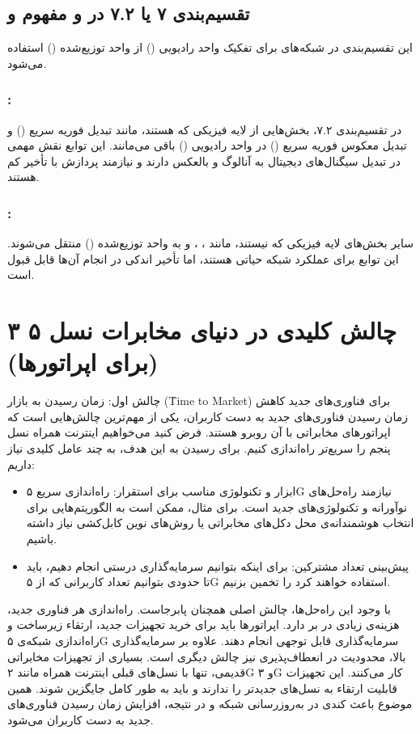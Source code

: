 \documentclass[landscape, 12pt]{report}
\begin{document}
\subsection*{تقسیم‌بندی ۷ یا ۷.۲ در  و مفهوم  و }
این تقسیم‌بندی در شبکه‌های  برای تفکیک واحد رادیویی () از واحد توزیع‌شده () استفاده می‌شود.

\subsubsection*{:}
در تقسیم‌بندی ۷.۲، بخش‌هایی از لایه فیزیکی که  هستند، مانند تبدیل فوریه سریع () و تبدیل معکوس فوریه سریع () در واحد رادیویی () باقی می‌مانند. این توابع نقش مهمی در تبدیل سیگنال‌های دیجیتال به آنالوگ و بالعکس دارند و نیازمند پردازش با تأخیر کم هستند.

\subsubsection*{:}
سایر بخش‌های لایه فیزیکی که  نیستند، مانند ، ،  و  به واحد توزیع‌شده () منتقل می‌شوند. این توابع برای عملکرد شبکه حیاتی هستند، اما تأخیر اندکی در انجام آن‌ها قابل قبول است.
\section*{
۳ چالش کلیدی در دنیای مخابرات نسل ۵ (برای اپراتورها)
}
چالش اول: زمان رسیدن به بازار (\r{Time to Market}) برای فناوری‌های جدید
کاهش زمان رسیدن فناوری‌های جدید به دست کاربران، یکی از مهم‌ترین چالش‌هایی است که اپراتورهای مخابراتی با آن روبرو هستند. فرض کنید می‌خواهیم اینترنت همراه نسل پنجم  را سریع‌تر راه‌اندازی کنیم. برای رسیدن به این هدف، به چند عامل کلیدی نیاز داریم:
\begin{itemize}
\item ابزار و تکنولوژی مناسب برای استقرار: راه‌اندازی سریع ۵G نیازمند راه‌حل‌های نوآورانه و تکنولوژی‌های جدید است. برای مثال، ممکن است به الگوریتم‌هایی برای انتخاب هوشمندانه‌ی محل دکل‌های مخابراتی یا روش‌های نوین کابل‌کشی نیاز داشته باشیم.
\item پیش‌بینی تعداد مشترکین: برای اینکه بتوانیم سرمایه‌گذاری درستی انجام دهیم، باید تا حدودی بتوانیم تعداد کاربرانی که از ۵G استفاده خواهند کرد را تخمین بزنیم.
\end{itemize}

با وجود این راه‌حل‌ها، چالش اصلی همچنان پابرجاست. راه‌اندازی هر فناوری جدید، هزینه‌ی زیادی در بر دارد. اپراتورها باید برای خرید تجهیزات جدید، ارتقاء زیرساخت و راه‌اندازی شبکه‌ی ۵G سرمایه‌گذاری قابل توجهی انجام دهند.
علاوه بر سرمایه‌گذاری بالا، محدودیت در انعطاف‌پذیری نیز چالش دیگری است. بسیاری از تجهیزات مخابراتی قدیمی، تنها با نسل‌های قبلی اینترنت همراه مانند ۲G و ۳G  کار می‌کنند. این تجهیزات قابلیت ارتقاء به نسل‌های جدیدتر را ندارند و باید به طور کامل جایگزین شوند. همین موضوع باعث کندی در به‌روزرسانی شبکه و در نتیجه، افزایش زمان رسیدن فناوری‌های جدید به دست کاربران می‌شود.
\end{document}

